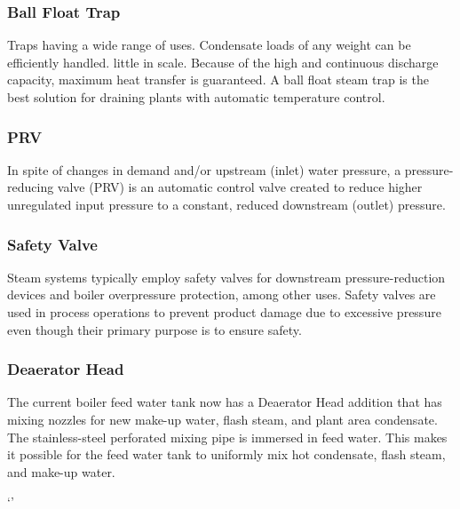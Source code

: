 \subsubsection{Ball Float Trap}
Traps having a wide range of uses. Condensate loads of any weight can be efficiently handled. little in scale. Because of the high and continuous discharge capacity, maximum heat transfer is guaranteed. A ball float steam trap is the best solution for draining plants with automatic temperature control.

\subsubsection{PRV}
In spite of changes in demand and/or upstream (inlet) water pressure, a pressure-reducing valve (PRV) is an automatic control valve created to reduce higher unregulated input pressure to a constant, reduced downstream (outlet) pressure.

\subsubsection{Safety Valve}
Steam systems typically employ safety valves for downstream pressure-reduction devices and boiler overpressure protection, among other uses. Safety valves are used in process operations to prevent product damage due to excessive pressure even though their primary purpose is to ensure safety.

\subsubsection{Deaerator Head}
The current boiler feed water tank now has a Deaerator Head addition that has mixing nozzles for new make-up water, flash steam, and plant area condensate. The stainless-steel perforated mixing pipe is immersed in feed water. This makes it possible for the feed water tank to uniformly mix hot condensate, flash steam, and make-up water.

`'